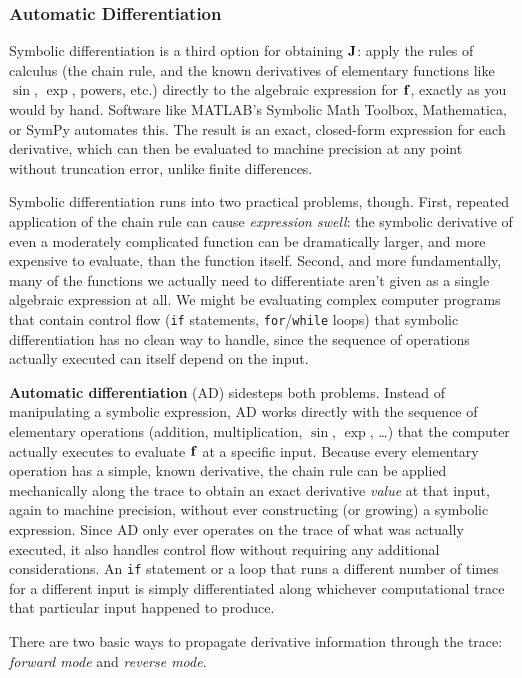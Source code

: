 \subsubsection{Automatic Differentiation}
\label{sec:automatic-differentiation}

Symbolic differentiation is a third option for obtaining $\mathbf{J}$: apply the rules of calculus (the chain rule, and the known derivatives of elementary functions like $\sin$, $\exp$, powers, etc.) directly to the algebraic expression for $\mathbf{f}$, exactly as you would by hand. Software like MATLAB's Symbolic Math Toolbox, Mathematica, or SymPy automates this. The result is an exact, closed-form expression for each derivative, which can then be evaluated to machine precision at any point without truncation error, unlike finite differences.

Symbolic differentiation runs into two practical problems, though. First, repeated application of the chain rule can cause \emph{expression swell}: the symbolic derivative of even a moderately complicated function can be dramatically larger, and more expensive to evaluate, than the function itself. Second, and more fundamentally, many of the functions we actually need to differentiate aren't given as a single algebraic expression at all. We might be evaluating complex computer programs that contain control flow (\texttt{if} statements, \texttt{for}/\texttt{while} loops) that symbolic differentiation has no clean way to handle, since the sequence of operations actually executed can itself depend on the input.

\textbf{Automatic differentiation} (AD) sidesteps both problems. Instead of manipulating a symbolic expression, AD works directly with the sequence of elementary operations (addition, multiplication, $\sin$, $\exp$, \ldots) that the computer actually executes to evaluate $\mathbf{f}$ at a specific input. Because every elementary operation has a simple, known derivative, the chain rule can be applied mechanically along the trace to obtain an exact derivative \emph{value} at that input, again to machine precision, without ever constructing (or growing) a symbolic expression. Since AD only ever operates on the trace of what was actually executed, it also handles control flow without requiring any additional considerations. An \texttt{if} statement or a loop that runs a different number of times for a different input is simply differentiated along whichever computational trace that particular input happened to produce.

There are two basic ways to propagate derivative information through the trace: \emph{forward mode} and \emph{reverse mode}.

